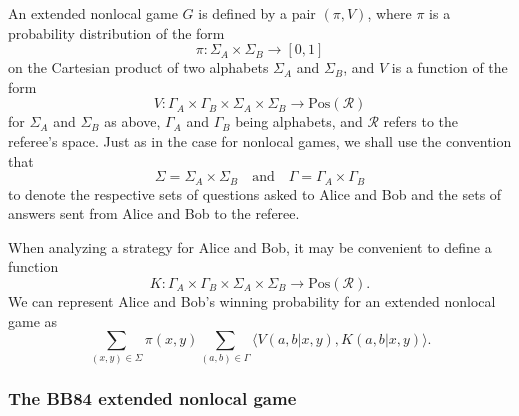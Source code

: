 \documentclass[nofootinbib,superscriptaddress,a4paper,twocolumn,longbibliography,floatfix,pra]{revtex4-2}
\renewcommand{\ip}[2]{\langle #1 , #2\rangle}
\newcommand{\setft}[1]{\mathrm{#1}}
\newcommand{\Pos}{\setft{Pos}}
\newcommand{\R}{\mathcal{R}}
\begin{document}
An extended nonlocal game $G$ is defined by a pair $(\pi, V)$, where $\pi$ is a
probability distribution of the form
\begin{equation}
    \pi: \Sigma_A \times \Sigma_B \rightarrow \left[0, 1\right]
\end{equation}
on the Cartesian product of two alphabets $\Sigma_A$ and $\Sigma_B$, and $V$ is
a function of the form
\begin{equation}
    V: \Gamma_A \times \Gamma_B \times \Sigma_A \times \Sigma_B \rightarrow
    \Pos(\R)
\end{equation}
for $\Sigma_A$ and $\Sigma_B$ as above, $\Gamma_A$ and $\Gamma_B$ being
alphabets, and $\R$ refers to the referee's space. Just as in the case for
nonlocal games, we shall use the convention that
\begin{equation}
    \Sigma = \Sigma_A \times \Sigma_B \quad \text{and} \quad \Gamma = \Gamma_A
    \times \Gamma_B
\end{equation}
to denote the respective sets of questions asked to Alice and Bob and the sets
of answers sent from Alice and Bob to the referee.

When analyzing a strategy for Alice and Bob, it may be convenient to define a
function
\begin{equation}
    K: \Gamma_A \times \Gamma_B \times \Sigma_A \times \Sigma_B \rightarrow
    \Pos(\R).
\end{equation}
We can represent Alice and Bob's winning probability for an extended nonlocal game as
\begin{equation}
    \sum_{(x,y) \in \Sigma} \pi(x,y) \sum_{(a,b) \in \Gamma}
    \ip{V(a,b|x,y)}{K(a,b|x,y)}.
\end{equation}

\subsubsection{The BB84 extended nonlocal game}
\end{document}
